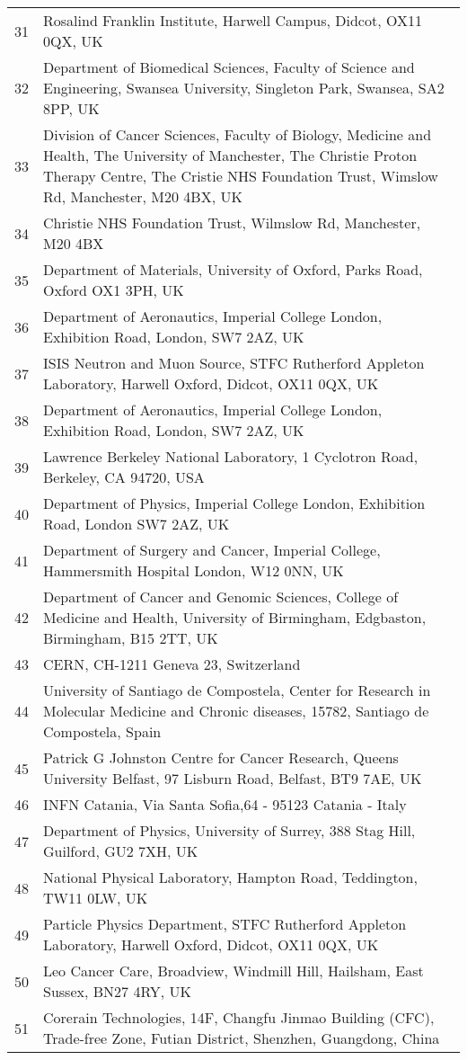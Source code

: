 {\begin{tabular}{ c p{15cm} }
     31 & Rosalind Franklin Institute, Harwell Campus, Didcot, OX11 0QX, UK\\
     32 & Department of Biomedical Sciences, Faculty of Science and Engineering, Swansea University, Singleton Park, Swansea, SA2 8PP, UK\\
     33 & Division of Cancer Sciences, Faculty of Biology, Medicine and Health, The University of Manchester, The Christie Proton Therapy Centre, The Cristie NHS Foundation Trust, Wimslow Rd, Manchester, M20 4BX, UK\\
     34 & Christie NHS Foundation Trust, Wilmslow Rd, Manchester, M20 4BX\\
     35 & Department of Materials, University of Oxford, Parks Road, Oxford OX1 3PH, UK\\
     36 & Department of Aeronautics, Imperial College London, Exhibition Road, London, SW7 2AZ, UK\\
     37 & ISIS Neutron and Muon Source, STFC Rutherford Appleton Laboratory, Harwell Oxford, Didcot, OX11 0QX, UK\\
     38 & Department of Aeronautics, Imperial College London, Exhibition Road, London, SW7 2AZ, UK\\
     39 & Lawrence Berkeley National Laboratory, 1 Cyclotron Road, Berkeley, CA 94720, USA\\
     40 & Department of Physics, Imperial College London, Exhibition Road, London SW7 2AZ, UK\\
     41 & Department of Surgery and Cancer, Imperial College, Hammersmith Hospital London, W12 0NN, UK\\
     42 & Department of Cancer and Genomic Sciences, College of Medicine and Health, University of Birmingham, Edgbaston, Birmingham, B15 2TT, UK\\
     43 & CERN, CH-1211 Geneva 23, Switzerland\\
     44 & University of Santiago de Compostela, Center for Research in Molecular Medicine and Chronic diseases, 15782, Santiago de Compostela, Spain\\
     45 & Patrick G Johnston Centre for Cancer Research, Queens University Belfast, 97 Lisburn Road, Belfast, BT9 7AE, UK\\
     46 & INFN Catania, Via Santa Sofia,64 - 95123 Catania - Italy\\
     47 & Department of Physics, University of Surrey, 388 Stag Hill, Guilford, GU2 7XH, UK\\
     48 & National Physical Laboratory, Hampton Road, Teddington, TW11 0LW, UK\\
     49 & Particle Physics Department, STFC Rutherford Appleton Laboratory, Harwell Oxford, Didcot, OX11 0QX, UK\\
     50 & Leo Cancer Care, Broadview, Windmill Hill, Hailsham, East Sussex, BN27 4RY, UK\\
     51 & Corerain Technologies, 14F, Changfu Jinmao Building (CFC), Trade-free Zone, Futian District, Shenzhen, Guangdong, China\\
  \end{tabular}
}
